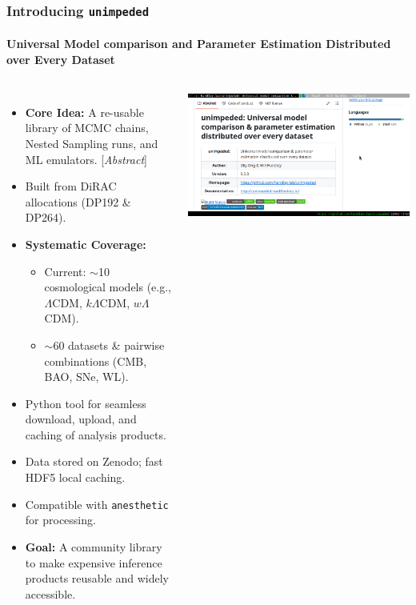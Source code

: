 \documentclass[aspectratio=169]{beamer}
\begin{document}
\begin{frame}
    \frametitle{Introducing \texttt{unimpeded}}
    \framesubtitle{Universal Model comparison and Parameter Estimation Distributed over Every Dataset}
    \begin{columns}[T]
        \begin{itemize}
            \item \textbf{Core Idea:} A re-usable library of MCMC chains, Nested Sampling runs, and ML emulators. [\textit{Abstract}]
            \item Built from DiRAC allocations (DP192 \& DP264).
            \item \textbf{Systematic Coverage:}
                \begin{itemize}
                    \item Current: $\sim$10 cosmological models (e.g., $\Lambda$CDM, $k\Lambda$CDM, $w\Lambda$CDM).
                    \item $\sim$60 datasets \& pairwise combinations (CMB, BAO, SNe, WL).
                \end{itemize}
            \item Python tool for seamless download, upload, and caching of analysis products.
            \item Data stored on Zenodo; fast HDF5 local caching.
            \item Compatible with \texttt{anesthetic} for processing. 
            \item \textbf{Goal:} A community library to make expensive inference products reusable and widely accessible.
        \end{itemize}
            \includegraphics[width=\columnwidth]{figures/2025-05-21_08-33-40.png}
    \end{columns}
\end{frame}
\end{document}
